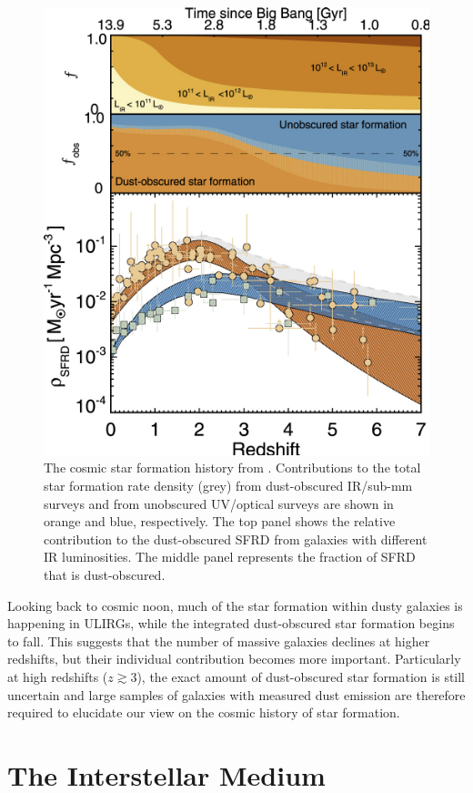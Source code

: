 \begin{figure}
    \centering
	\includegraphics[width=0.8\columnwidth]{Figures/cosmic_sfrd.pdf}
	\caption[Cosmic star formation history]{The cosmic star formation history from \citealt{Zavala_2021}. Contributions to the total star formation rate density (grey) from dust-obscured IR/sub-mm surveys and from unobscured UV/optical surveys are shown in orange and blue, respectively. The top panel shows the relative contribution to the dust-obscured SFRD from galaxies with different IR luminosities. The middle panel represents the fraction of SFRD that is dust-obscured.}
	\label{fig:cosmic_sfrd}
\end{figure}

Looking back to cosmic noon, much of the star formation within dusty galaxies is happening in ULIRGs, while the integrated dust-obscured star formation begins to fall. This suggests that the number of massive galaxies declines at higher redshifts, but their individual contribution becomes more important. Particularly at high redshifts ($z \gtrsim 3$), the exact amount of dust-obscured star formation is still uncertain and large samples of galaxies with measured dust emission are therefore required to elucidate our view on the cosmic history of star formation.

\section{The Interstellar Medium}

